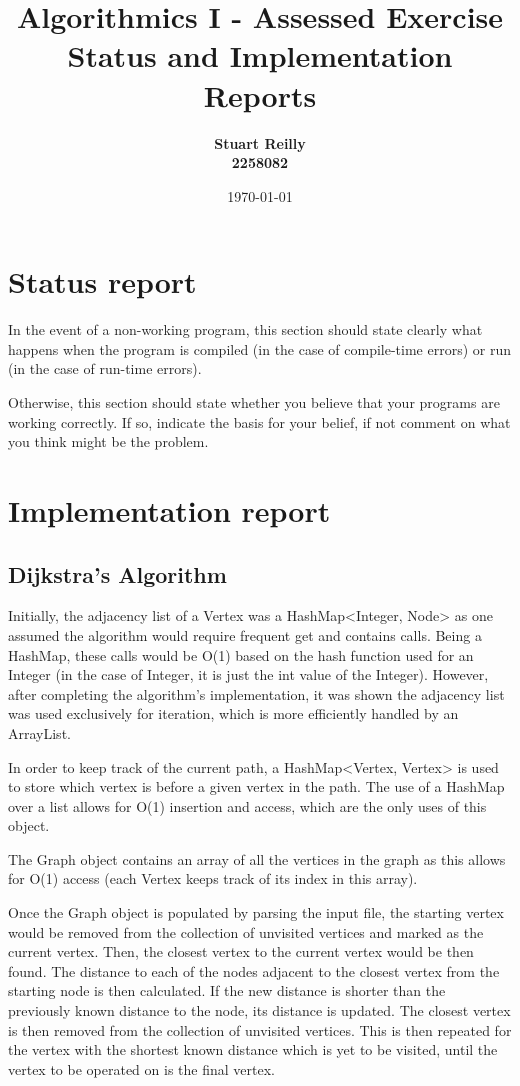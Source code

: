 \documentclass{article}
\title{Algorithmics I - Assessed Exercise\\ \vspace{4mm}
Status and Implementation Reports}
\author{\textbf{Stuart Reilly} \\ \textbf{2258082} }
\date{\today}
\begin{document}
    \maketitle

    \section*{Status report}

    In the event of a non-working program, this section should state clearly what happens when the program is compiled (in the case of compile-time errors) or run (in the case of run-time errors).

    Otherwise, this section should state whether you believe that your programs are working correctly. If so, indicate the basis for your belief, if not comment on what you think might be the problem.

    \section*{Implementation report}

    \subsection*{Dijkstra's Algorithm}

    Initially, the adjacency list of a Vertex was a HashMap<Integer, Node> as one assumed the algorithm would require
    frequent get and contains calls.
    Being a HashMap, these calls would be O(1) based on the hash function used for an Integer (in the case of Integer, it is
    just the int value of the Integer).
    However, after completing the algorithm's implementation, it was shown the adjacency list was used exclusively for
    iteration, which is more efficiently handled by an ArrayList.

    In order to keep track of the current path, a HashMap<Vertex, Vertex> is used to store which vertex is before a given
    vertex in the path.
    The use of a HashMap over a list allows for O(1) insertion and access, which are the only uses of this object.

    The Graph object contains an array of all the vertices in the graph as this allows for O(1) access (each Vertex keeps
    track of its index in this array).

    Once the Graph object is populated by parsing the input file, the starting vertex would be removed from the collection
    of unvisited vertices and marked as the current vertex.
    Then, the closest vertex to the current vertex would be then found.
    The distance to each of the nodes adjacent to the closest vertex from the starting node is then calculated.
    If the new distance is shorter than the previously known distance to the node, its distance is updated.
    The closest vertex is then removed from the collection of unvisited vertices.
    This is then repeated for the vertex with the shortest known distance which is yet to be visited, until the vertex to be
    operated on is the final vertex.
\end{document}
